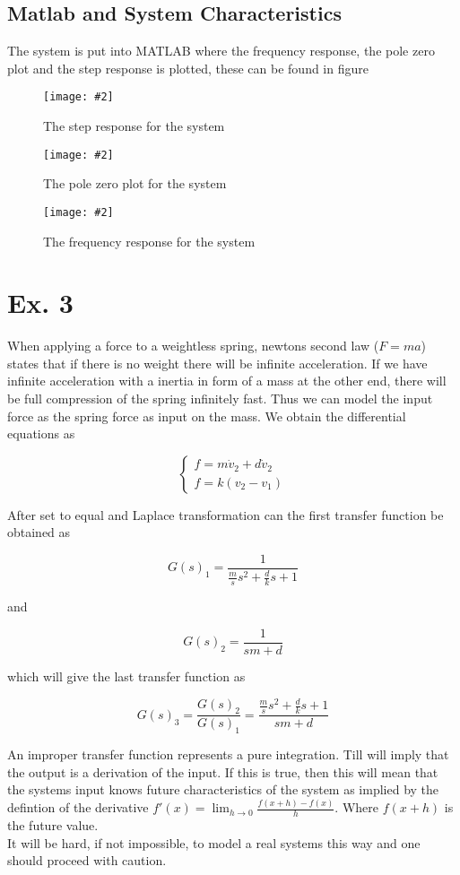 \documentclass[12pt,a4paper]{article}
\newcounter{eq}
\newcommand{\eq}[1]{
\begin{equation}
        #1
\end{equation}
    }
\newcommand{\fig}[4]{
  \begin{figure}[!h]
    \begin{center}
      \texttt{[image: \#2]}
      \label{fig:#3}
      \caption{#4}
    \end{center}
  \end{figure}
}
\begin{document}
  \subsection{Matlab and System Characteristics}
    The system is put into MATLAB where the frequency response, the 
    pole zero plot and the step response is plotted, these can be found
    in figure

    \fig{0.5}{plot_step_response.png}{step_response_1}{The step response for
    the system}
    \fig{0.5}{plot_zero_map.png}{pole_zero_2}{The pole zero plot for the
    system}
    \fig{0.5}{plot_bode.png}{frequency_response_1}{The
    frequency response for the system}

  \section{Ex. 3}
    When applying a force to a weightless spring, newtons second law
    ($F=ma$) states that if there is no weight there will be infinite
    acceleration. If we have infinite acceleration with a inertia in
    form of a mass at the other end, there will be full compression of
    the spring infinitely fast. Thus we can model the input force as the
    spring force as input on the mass. We obtain the differential
    equations as
    \eq{
        \begin{cases}
            f=m\dot{v}_2+d\dot{v}_2\\
            f=k(v_2-v_1)
        \end{cases}
    }
    After set to equal and Laplace transformation can the first
    transfer function be obtained as
    \eq{
    G(s)_1=\frac{1}{\frac{m}{s}s^2+\frac{d}{k}s+1}
    }
    and
    \eq{
    G(s)_2=\frac{1}{sm+d}
    }
    which will give the last transfer function as
    \eq{
    G(s)_3=\frac{G(s)_2}{G(s)_1}=\frac{\frac{m}{s}s^2+\frac{d}{k}s+1}{sm+d}
    }
    An improper transfer function represents a pure integration. Till
    will imply that the output is a derivation of the input. If this is
    true, then this will mean that the systems input knows
    future characteristics of the system as implied by the defintion of the 
    derivative $f'(x)=\lim_{h \to 0} \frac{f(x+h)-f(x)}{h}$. Where
    $f(x+h)$ is the future value.\\
    It will be hard, if not impossible, to model a real systems this
    way and one should proceed with caution. 
\end{document}
